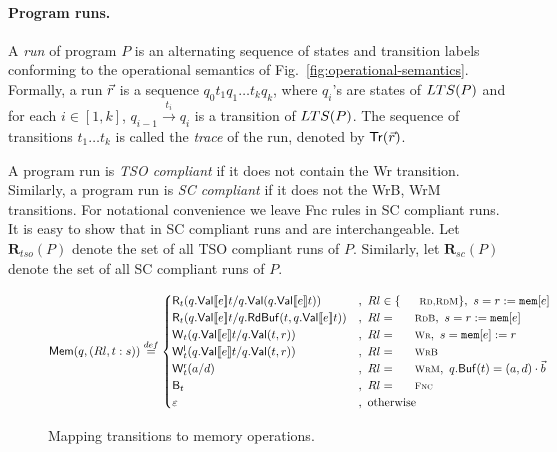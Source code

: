 \newcommand{\aliruns}{\ensuremath{\mathbf{R}}}
\newcommand{\alirunsx}[2]{\ensuremath{\aliruns_{#1}(#2)}}


\paragraph{Program runs.}
A {\em run} of program $P$ is an alternating sequence of states and transition labels conforming to the operational semantics of Fig.~\ref{fig:operational-semantics}.
Formally, a run $\vec{r}$ is a sequence $q_0t_1q_1\ldots t_kq_k$, where $q_i$'s are states of $\mathnormal{LTS}(P)$ and for each $i\in[1,k]$, $q_{i-1}\xrightarrow{t_i}q_i$ is a transition of $\mathnormal{LTS}(P)$.
The sequence of transitions $t_1\ldots t_k$ is called the {\em trace} of the run, denoted by $\mathsf{Tr}(\vec{r})$.

A program run is {\em TSO compliant} if it does not contain the {\sc \small Wr} transition.
Similarly, a program run is {\em SC compliant} if it does not the {\sc \small WrB, WrM} transitions.
For notational convenience we leave {\sc \small Fnc} rules in SC compliant runs.
It is easy to show that in SC compliant runs {\alifence} and {\aliskip} are interchangeable. 
Let $\alirunsx {tso} P$ denote the set of all TSO compliant runs of $P$.
Similarly, let $\alirunsx {sc} P$ denote the set of all SC compliant runs of $P$.

\begin{figure*}[th]
\[
\alimemtracex {q,(Rl,t:s)} \stackrel{def}{=} 
 \begin{cases}
  \alireadx t {q.\alivaluation{\alievalx e}t} {q.\alivaluationx {q.\alivaluation{\alievalx e}t}} & ,\ Rl\in\{\textnormal{\sc\small Rd,RdM}\},\ s=r:=\alimemx e\\
  \alireadx t {q.\alivaluation{\alievalx e}t} {q.\alireadbufferx t {q.\alivaluation{\alievalx e}t}} &,\ Rl=\textnormal{\sc\small RdB},\ s=r:=\alimemx e\\
  \aliwritex t {q.\alivaluation{\alievalx e}t} {q.\alivaluationx {t,r}} &,\ Rl=\textnormal{\sc\small Wr},\ s=\alimemx e:= r\\
  \locwritex t {q.\alivaluation{\alievalx e}t} {q.\alivaluationx {t,r}} &,\ Rl=\textnormal{\sc\small WrB}\\
  \remwritex t a d &,\ Rl=\textnormal{\sc\small WrM},\ q.\alibufferx t=(a,d)\cdot \alisequencex b\\
  \alibarrierx t &,\ Rl=\textnormal{\sc \small Fnc}\\
  \varepsilon &,\ \textnormal{otherwise}
 \end{cases}
\]
\caption{Mapping transitions to memory operations.}
\label{fig:trans-to-memory}
\end{figure*}



